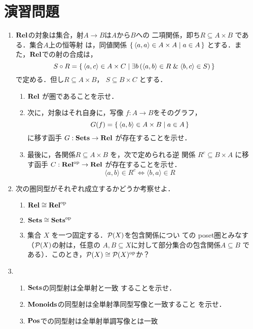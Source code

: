 \section{演習問題}
\begin{enumerate}
 \item $\mathbf{Rel}$の対象は集合，射$A \to B$は$A$から$B$への
       二項関係，即ち$R \subseteq A \times B$ である．集合$A$上の恒等射
       は，同値関係 $\set{\langle a, a\rangle \in A\times A | a \in A}$
       とする．また，$\mathbf{Rel}$での射の合成は，
       \[
	S \circ R = \set{\langle a, c\rangle \in A \times C | \exists
       b\,(\langle a, b\rangle \in R\; \&\; \langle b, c\rangle \in S)}
       \]
       で定める．但し$R \subseteq A \times B$， $S \subseteq B
       \times C$ とする．
       \begin{enumerate}
	\item $\mathbf{Rel}$ が圏であることを示せ．
	\item 次に，対象はそれ自身に，写像 $f: A \to B$をそのグラフ，
	      \[
	       G(f) = \set{\langle a, b\rangle \in A \times B | a \in A}
	      \]
	      に移す函手 $G: \mathbf{Sets} \to \mathbf{Rel}$ が存在することを示せ．
	\item 最後に，各関係$R \subseteq A \times B$ を，次で定められる逆
	      関係 $R^c \subseteq B \times A$ に移す函手 $C: \mathbf{Rel}^{\rm
	      op} \to \mathbf{Rel}$ が存在することを示せ．
	      \[
	       \langle a, b \rangle \in R^c \iff \langle b, a\rangle \in R
	      \]
       \end{enumerate}
 \item 次の圏同型がそれぞれ成立するかどうか考察せよ．
       \begin{enumerate}
	\item $\mathbf{Rel} \cong \mathbf{Rel}^{\rm op}$
	\item $\mathbf{Sets} \cong \mathbf{Sets}^{\rm op}$
	\item 集合 $X$ を一つ固定する．$\mathcal{P}(X)$を包含関係につい
	      ての poset圏とみなす（$\mathcal{P}(X)$の射は，任意の $A, B
	      \subseteq X$に対して部分集合の包含関係$A\subseteq B$
	      である）．このとき，$\mathcal{P}(X) \cong \mathcal{P}(X)^{\rm op}$か？
       \end{enumerate}
 \item \begin{enumerate}
	\item $\mathbf{Sets}$の同型射は全単射と一致
	      することを示せ．
	\item ${\bf Monoids}$の同型射は全単射準同型写像と一致すること
	      を示せ．
	\item $\mathbf{Pos}$での同型射は全単射単調写像とは一致{\bfseries
}
\end{enumerate}
\end{enumerate}
